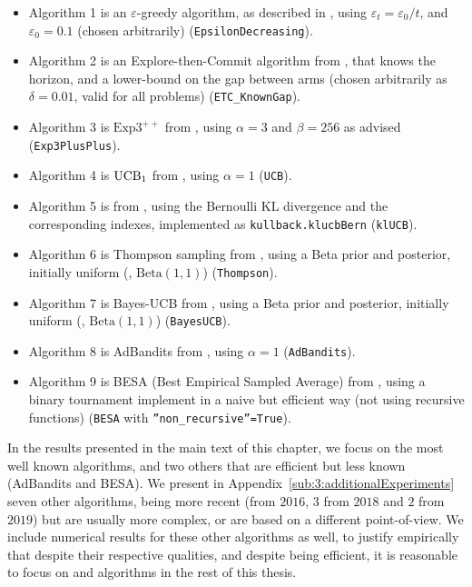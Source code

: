 
\begin{itemize}
    \item Algorithm 1 is
    an $\varepsilon$-greedy algorithm, as described in \cite{Bubeck12}, using $\varepsilon_t = \varepsilon_0 / t$, and $\varepsilon_0 = 0.1$ (chosen arbitrarily) (\texttt{EpsilonDecreasing}).

    \item Algorithm 2 is
    an Explore-then-Commit algorithm from \cite{GarivierETC2016}, that knows the horizon, and a lower-bound on the gap between arms (chosen arbitrarily as $\delta=0.01$, valid for all problems) (\texttt{ETC\_KnownGap}).

    \item Algorithm 3 is
    $\mathrm{Exp}3^{++}$ from \cite{Seldin17}, using $\alpha=3$ and $\beta=256$ as advised (\texttt{Exp3PlusPlus}).

    \item Algorithm 4 is
    $\mathrm{UCB}_1$ from \cite{Auer02}, using $\alpha=1$ (\texttt{UCB}).

    \item Algorithm 5 is
    \klUCB{} from \cite{KLUCBJournal}, using the Bernoulli KL divergence and the corresponding \klUCB{} indexes, implemented as \texttt{kullback.klucbBern} (\texttt{klUCB}).

    \item Algorithm 6 is
    Thompson sampling from \cite{Kaufmann12Thompson}, using a Beta prior and posterior, initially uniform (\ie, $\mathrm{Beta}(1,1)$) (\texttt{Thompson}).

    \item Algorithm 7 is
    Bayes-UCB from \cite{Kaufmann12BUCB}, using a Beta prior and posterior, initially uniform (\ie, $\mathrm{Beta}(1,1)$) (\texttt{BayesUCB}).

    \item Algorithm 8 is
    AdBandits from \cite{Truzzi13}, using $\alpha=1$ (\texttt{AdBandits}).

    \item Algorithm 9 is
    BESA (Best Empirical Sampled Average) from \cite{Baransi2014}, using a binary tournament implement in a naive but efficient way (not using recursive functions) (\texttt{BESA} with \texttt{''non\_recursive''=True}).
\end{itemize}

In the results presented in the main text of this chapter, we focus on the most well known algorithms, and two others that are efficient but less known (AdBandits and BESA).
We present in Appendix~\ref{sub:3:additionalExperiments} seven other algorithms, being more recent (from $2016$, $3$ from $2018$ and $2$ from $2019$) but are usually more complex, or are based on a different point-of-view.
We include numerical results for these other algorithms as well, to justify empirically that despite their respective qualities, and despite being efficient, it is reasonable to focus on \UCB{} and \klUCB{} algorithms in the rest of this thesis.


